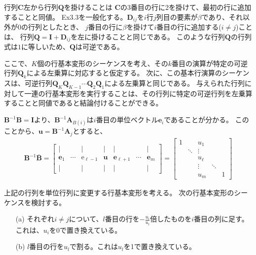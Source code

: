 \documentclass{jsarticle}
\begin{document}
行列$\bm{C}$左から行列$\bm{Q}$を掛けることは
$\bm{C}$の3番目の行に2を掛けて、最初の行に追加することと同値。
Ex3.3を一般化する。$\bm{D}_{ij}$を$i$行$j$列目の要素が$\beta$であり、それ以外が$0$の行列としたとき、
$j$番目の行に$\beta$を掛けて$i$番目の行に追加する($i\neq j$)ことは、
行列$\bm{Q} = \bm{I} + \bm{D}_{ij}$を左に掛けることと同じである。
このような行列$\bm{Q}$の行列式は$1$に等しいため、$\bm{Q}$は可逆である。 

ここで、$K$個の行基本変形のシーケンスを考え、その$k$番目の演算が特定の可逆行列$\bm{Q}_k$による左乗算に対応すると仮定する。
次に、この基本行演算のシーケンスは、可逆行列$\bm{Q}_K\bm{Q}_{K-1}\cdots\bm{Q}_2\bm{Q}_1$による左乗算と同じである。
与えられた行列に対して一連の行基本変形を実行することは、その行列に特定の可逆行列を左乗算することと同値であると結論付けることができる。 
  
$\bm{B}^{-1}\bm{B}=\bm{I}$より、$\bm{B}^{-1}\bm{A}_{B(i)}$は$i$番目の単位ベクトル$\bm{e}_i$であることが分かる。
このことから、$\bm{u}=\bm{B}^{-1}\bm{A}_j$とすると、
\begin{equation}
  \begin{array}{l}
  \bm{B}^{-1} \bar{\bm{B}}=\left[\begin{array}{ccccccc}
  \mid & & \mid & \mid & \mid & & \mid \\
  \mathbf{e}_{1} & \cdots & \mathrm{e}_{\ell-1} & \mathbf{u} & \mathbf{e}_{\ell+1} & \cdots & \mathbf{e}_{m} \\
  \mid & & \mid & \mid & \mid & & \mid
  \end{array}\right]
  =\left[\begin{array}{ccccc}
  1 & & u_{1} & & \\
  & \ddots & \vdots & & \\
  & & u_{\ell} & & \\
  & & \vdots & \ddots & \\
  & & u_{m} & & 1
  \end{array}\right]
  \end{array}
\end{equation}

上記の行列を単位行列に変更する行基本変形を考える。 次の行基本変形のシーケンスを検討する。
\begin{itemize}
  \item[(a)] それぞれ$i\neq j$について、$l$番目の行を$-\frac{u_i}{u_l}$倍したものを$i$番目の列に足す。これは、$u_i$を0で置き換えている。
  \item[(b)] $l$番目の行を$u_l$で割る。これは$u_l$を1で置き換えている。
\end{itemize}
\end{document}
